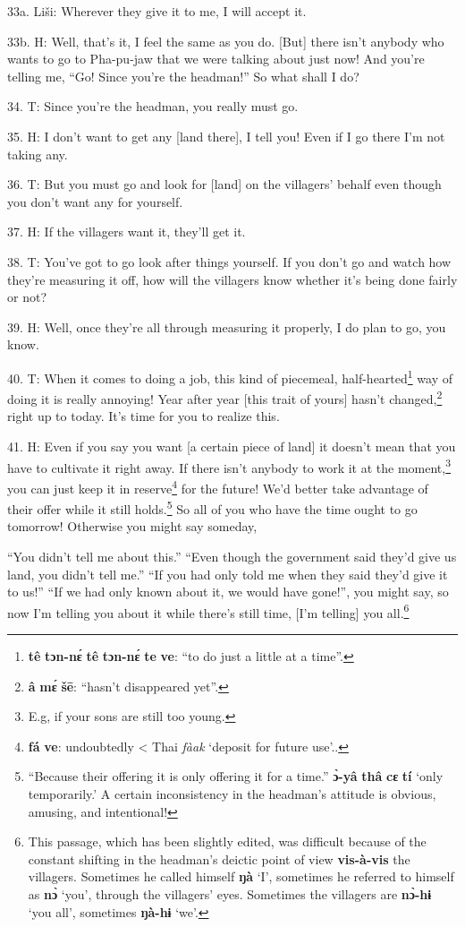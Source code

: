 33a. Liši: Wherever they give it to me, I will accept it.

33b. H: Well, that's it, I feel the same as you do. [But] there isn't anybody who
wants to go to Pha-pu-jaw that we were talking about just now! And you're telling
me, ``Go! Since you're the headman!'' So what shall I do?

34. T: Since you're the headman, you really must go.

35. H: I don't want to get any [land there], I tell you! Even if I go there I'm
not taking any.

36. T: But you must go and look for [land] on the villagers' behalf even though
you don't want any for yourself.

37. H: If the villagers want it, they'll get it.

38. T: You've got to go look after things yourself. If you don't go and watch
how they're measuring it off, how will the villagers know whether it's being done
fairly or not?

39. H: Well, once they're all through measuring it properly, I do plan to go, you
know.

40. T: When it comes to doing a job, this kind of piecemeal, half-hearted\footnote{\textbf{tê} \textbf{tɔn-nɛ́} \textbf{tê} \textbf{tɔn-nɛ́} \textbf{te} \textbf{ve}: ``to do just a little at a time''.}
way of doing it is really annoying! Year after year [this trait of yours] hasn't
changed,\footnote{\textbf{â} \textbf{mɛ́} \textbf{šē}: ``hasn't disappeared yet''.} right up to today. It's time for you to realize this.

41. H: Even if you say you want [a certain piece of land] it doesn't mean that you
have to cultivate it right away. If there isn't anybody to work it at the moment,\footnote{E.g, if your sons are still too young.}
you can just keep it in reserve\footnote{\textbf{fá} \textbf{ve}: undoubtedly < Thai \textit{fàak} `deposit for future use'..} for the future! We'd better take advantage
of their offer while it still holds.\footnote{``Because their offering it is only offering it for a time.'' \textbf{ɔ̀-yâ} \textbf{thâ} \textbf{cɛ} \textbf{tí} `only temporarily.' A certain inconsistency in the headman's attitude is obvious, amusing, and intentional!} So all of you who have the time ought
to go tomorrow! Otherwise you might say someday,

``You didn't tell me about this.'' ``Even though the government said they'd give
us land, you didn't tell me.'' ``If you had only told me when they said they'd
give it to us!'' ``If we had only known about it, we would have gone!'', you might
say, so now I'm telling you about it while there's still time, [I'm telling] you
all.\footnote{This passage, which has been slightly edited, was difficult because of the constant shifting in the headman's deictic point of view \textbf{vis-à-vis} the villagers. Sometimes he called himself \textbf{ŋà} `I', sometimes he referred to himself as \textbf{nɔ̀} `you', through the villagers' eyes. Sometimes the villagers are \textbf{nɔ̀-hɨ} `you all', sometimes \textbf{ŋà-hɨ} `we'.}


